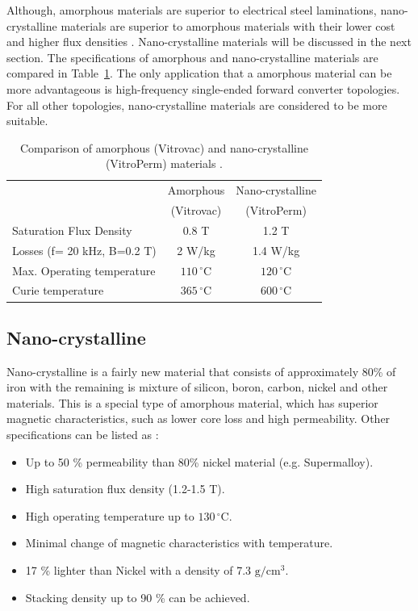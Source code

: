 \documentclass[a4paper, 11pt]{article} %
\begin{document}
Although, amorphous materials are superior to electrical steel laminations, nano-crystalline materials are superior to amorphous materials with their lower cost and higher flux densities \cite{vitroperm_vitrovac}. Nano-crystalline materials will be discussed in the next section. The specifications of amorphous and nano-crystalline materials are compared in Table~\ref{vitropermvitrovac}. The only  application that a amorphous material can be more advantageous is high-frequency single-ended forward converter topologies. For all other topologies, nano-crystalline materials are considered to be more suitable.

\begin{table}[]
\begin{center}
\begin{tabular}{lcc}
 & Amorphous & Nano-crystalline \\ 
 & (Vitrovac) & (VitroPerm) \\
\hline
Saturation Flux Density & 0.8 T & 1.2 T \\
Losses (f= 20 kHz, B=0.2 T) & 2 W/kg & 1.4 W/kg \\
Max. Operating temperature & $110\,^{\circ}\mathrm{C}$ & $120\,^{\circ}\mathrm{C}$ \\
Curie temperature & $365\,^{\circ}\mathrm{C}$ & $600\,^{\circ}\mathrm{C}$ \\
\hline
\end{tabular} 
\end{center}
\caption{Comparison of amorphous (Vitrovac) and nano-crystalline (VitroPerm) materials \cite{vitroperm_vitrovac}.}
\label{vitropermvitrovac}
\end{table}

\subsection*{Nano-crystalline}

Nano-crystalline is a fairly new material that consists of approximately 80\% of iron with the remaining is mixture of silicon, boron, carbon, nickel and other materials. This is a special type of amorphous material, which has superior magnetic characteristics, such as lower core loss and high permeability. Other specifications can be listed as \cite{Magnetics}:

\begin{itemize}
  \item Up to 50 \% permeability than 80\% nickel material (e.g. Supermalloy).
  \item High saturation flux density (1.2-1.5 T).
  \item High operating temperature up to $130\,^{\circ}\mathrm{C}$.
  \item Minimal change of magnetic characteristics with temperature.
  \item 17 \% lighter than Nickel with a density of 7.3 $\mathrm{g/cm^3}$.
  \item Stacking density up to 90 \% can be achieved.
\end{itemize}
\end{document}
